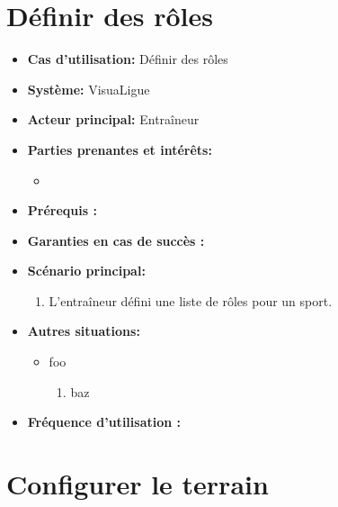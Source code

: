 \section{Définir des rôles}
\label{sec:definir_des_roles}

\begin{itemize}
    \item \textbf{Cas d'utilisation:} D\'efinir des r\^oles
    \item \textbf{Syst\`eme:} VisuaLigue
    \item \textbf{Acteur principal:} Entra\^ineur
    \item \textbf{Parties prenantes et int\'er\^ets:}
    	\begin{itemize}
    		\item
    	\end{itemize}
    \item \textbf{Pr\'erequis :}
    \item \textbf{Garanties en cas de succ\`es :}
    \item \textbf{Sc\'enario principal:}
        \begin{enumerate}
            \item L'entraîneur défini une liste de rôles pour un sport.
        \end{enumerate}
    \item \textbf{Autres situations:}
        \begin{itemize}
            \item foo
                \begin{enumerate}
                    \item baz
                \end{enumerate}
        \end{itemize}
	\item \textbf{Fréquence d'utilisation :}
\end{itemize}



\section{Configurer le terrain}
\label{sec:configurer_le_terrain}

